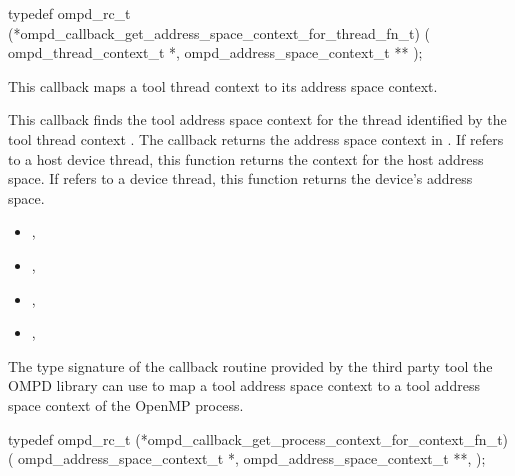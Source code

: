 \cspecificstart
\begin{ompSyntax}
typedef ompd_rc_t
(*ompd_callback_get_address_space_context_for_thread_fn_t) (
  ompd_thread_context_t *,
  ompd_address_space_context_t **
);
\end{ompSyntax}
\cspecificend

\descr
This callback maps a tool thread context to its address space context.

\argdesc
This callback finds the tool address space context for the thread
identified by the tool thread context .
The callback returns the address space context in .
If  refers to a host device thread,
this function returns the context for the host address space.
If  refers to a device thread,
this function returns the device's address space.

\crossreferences
\begin{itemize}
\item
  , 
\item
  , 
\item
  , 
\item
  , 
\end{itemize}

\label{ompd:ompd_callback_get_process_context_for_address_space_context}

\summary
The type signature of the callback routine provided by the 
third party tool the OMPD library can use to map a tool address space context
to a tool address space context of the OpenMP process.


\cspecificstart
\begin{ompSyntax}
typedef ompd_rc_t
(*ompd_callback_get_process_context_for_context_fn_t) (
  ompd_address_space_context_t *,
  ompd_address_space_context_t **,
);
\end{ompSyntax}
\cspecificend

